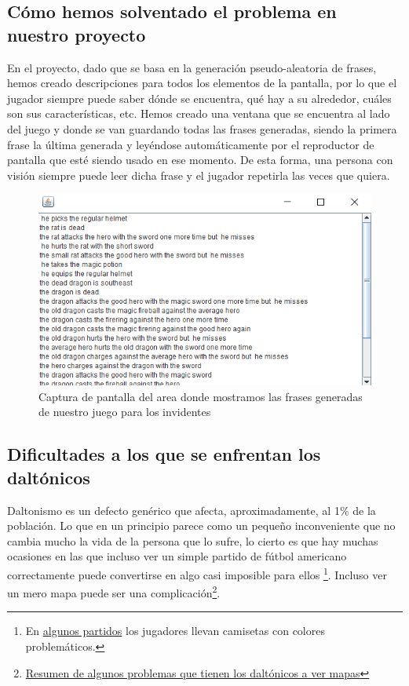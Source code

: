 \subsection{Cómo hemos solventado el problema en nuestro proyecto}

En el proyecto, dado que se basa en la generación pseudo-aleatoria de frases, hemos creado descripciones para todos los elementos de la pantalla, por lo que el jugador siempre puede saber dónde se encuentra, qué hay a su alrededor, cuáles son sus características, etc. Hemos creado una ventana que se encuentra al lado del juego y donde se van guardando todas las frases generadas, siendo la primera frase la última generada y leyéndose automáticamente por el reproductor de pantalla que esté siendo usado en ese momento. De esta forma, una persona con visión siempre puede leer dicha frase y el jugador repetirla las veces que quiera.

\begin{figure}[H]
		\includegraphics[width=\textwidth,height=\textheight,keepaspectratio]{./img/roomsGameTextArea.png}
	\caption{Captura de pantalla del area donde mostramos las frases generadas de nuestro juego para los invidentes}
	\label{fig:roomsgametextarea}
\end{figure}

\subsection{Dificultades a los que se enfrentan los daltónicos}

Daltonismo es un defecto genérico que afecta, aproximadamente, al 1\% de la población. Lo que en un principio parece como un pequeño inconveniente que no cambia mucho la vida de la persona que lo sufre, lo cierto es que hay muchas ocasiones en las que incluso ver un simple partido de fútbol americano correctamente puede convertirse en algo casi imposible para ellos \footnote{En \href{http://goo.gl/o3GkrP}{algunos partidos} los jugadores llevan camisetas con colores problemáticos.}. Incluso ver un mero mapa puede ser una complicación\footnote{\href{https://i.imgur.com/CMCywUU.jpg}{Resumen de algunos problemas que tienen los daltónicos a ver mapas}}.


